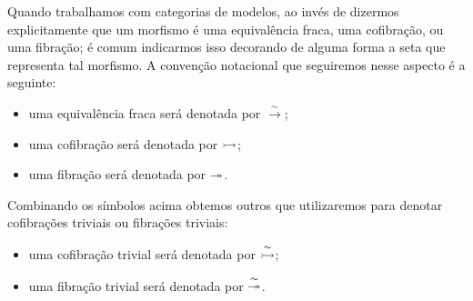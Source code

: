 \begin{obs}
  Quando trabalhamos com categorias de modelos, ao invés de dizermos explicitamente que um morfismo é uma equivalência fraca, uma cofibração, ou uma fibração; é comum indicarmos isso decorando de alguma forma a seta que representa tal morfismo.
  A convenção notacional que seguiremos nesse aspecto é a seguinte:
  \begin{itemize}
  \item uma equivalência fraca será denotada por $\overset{\sim}{\rightarrow}$;
    
  \item uma cofibração será denotada por $\rightarrowtail$;
    
  \item uma fibração será denotada por $\twoheadrightarrow$.
  \end{itemize}
  Combinando os símbolos acima obtemos outros que utilizaremos para denotar cofibrações triviais ou fibrações triviais:
  \begin{itemize}
  \item uma cofibração trivial será denotada por $\overset{\sim}{\rightarrowtail}$;
    
  \item uma fibração trivial será denotada por $\overset{\sim}{\twoheadrightarrow}$.
  \end{itemize}
\end{obs}